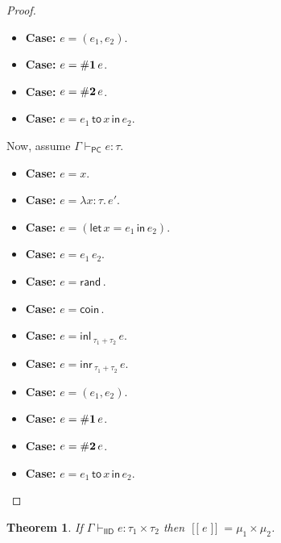 \documentclass{article}
\newtheorem*{theorem}{Theorem}
\DeclareMathOperator*\llb{[\![}
\DeclareMathOperator*\rrb{]\!]}
\newcommand{\iid}{\mathsf{IID}}
\newcommand{\pc}{\mathsf{PC}}
\newcommand{\letc}{\mathsf{let \,}}
\newcommand{\inc}{\mathsf{\, in \,}}
\newcommand{\toc}{\mathsf{\, to \,}}
\newcommand{\rand}{\mathsf{rand\,}}
\newcommand{\coin}{\mathsf{coin\,}}
\newcommand{\inl}{\mathsf{inl\,}}
\newcommand{\inr}{\mathsf{inr\,}}
\newcommand{\1}{\mathsf{\,\#1\,}}
\newcommand{\2}{\mathsf{\,\#2\,}}
\begin{document}
\begin{proof}
\begin{itemize}
	\item {\bf Case:} $e = (e_1, e_2)$.
	
	\item {\bf Case:} $e = {\bf \#1}\, e$.
	
	\item {\bf Case:} $e = {\bf \#2}\, e$.
	
	\item {\bf Case:} $e = e_1 \toc x \inc e_2$.
	
\end{itemize}

Now, assume $\Gamma \vdash_{\pc} e : \tau$.
\begin{itemize}
	\item {\bf Case:} $e = x$.

	\item {\bf Case:} $e = \lambda x : \tau .\, e'$.
	
	\item {\bf Case:} $e = (\letc x = e_1 \inc e_2)$.
	
	\item {\bf Case:} $e = e_1\, e_2$.
	
	\item {\bf Case:} $e = \rand\!$.
	
	\item {\bf Case:} $e = \coin\!$.
	
	\item {\bf Case:} $e = \inl_{\tau_1 + \tau_2}\, e$.
	
	\item {\bf Case:} $e = \inr_{\tau_1 + \tau_2}\, e$.
	
	\item {\bf Case:} $e = (e_1, e_2)$.
	
	\item {\bf Case:} $e = {\bf \#1}\, e$.
	
	\item {\bf Case:} $e = {\bf \#2}\, e$.
	
	\item {\bf Case:} $e = e_1 \toc x \inc e_2$.
	
\end{itemize}

\end{proof}

\begin{theorem}
	If $\Gamma \vdash_{\iid} e : \tau_1 \times \tau_2$
	then $\llb e \rrb = \mu_1 \times \mu_2$.
\end{theorem}
\end{document}
